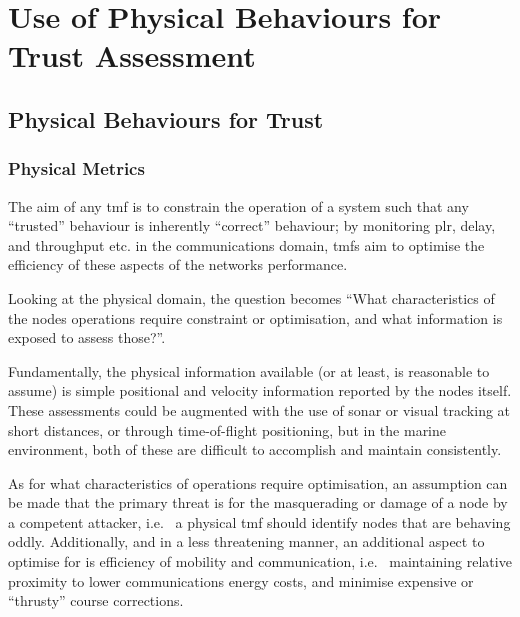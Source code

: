 \chapter{Use of Physical Behaviours for Trust Assessment} \label{ch:physical_trust}

\section{Physical Behaviours for Trust}\label{sec:physbev}

\subsection{Physical Metrics}
The aim of any \gls{tmf} is to constrain the operation of a system such that any ``trusted'' behaviour is inherently ``correct'' behaviour; by monitoring \gls{plr}, delay, and throughput etc. in the communications domain, \glspl{tmf} aim to optimise the efficiency of these aspects of the networks performance.

Looking at the physical domain, the question becomes ``What characteristics of the nodes operations require constraint or optimisation, and what information is exposed to assess those?''.

Fundamentally, the physical information available (or at least, is reasonable to assume) is simple positional and velocity information reported by the nodes itself.
These assessments could be augmented with the use of sonar or visual tracking at short distances, or through time-of-flight positioning, but in the marine environment, both of these are difficult to accomplish and maintain consistently.

As for what characteristics of operations require optimisation, an assumption can be made that the primary threat is for the masquerading or damage of a node by a competent attacker, i.e.~ a physical \gls{tmf} should identify nodes that are behaving oddly. 
Additionally, and in a less threatening manner, an additional aspect to optimise for is efficiency of mobility and communication, i.e.~ maintaining relative proximity to lower communications energy costs, and minimise expensive or ``thrusty'' course corrections.


